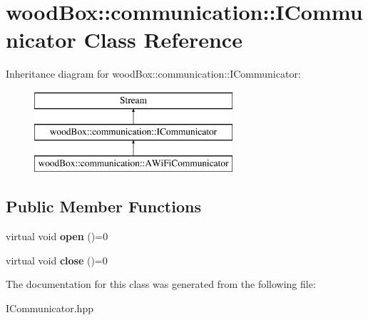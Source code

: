 \hypertarget{classwood_box_1_1communication_1_1_i_communicator}{}\section{wood\+Box\+:\+:communication\+:\+:I\+Communicator Class Reference}
\label{classwood_box_1_1communication_1_1_i_communicator}
Inheritance diagram for wood\+Box\+:\+:communication\+:\+:I\+Communicator\+:\begin{figure}[H]
\begin{center}
\leavevmode
\includegraphics[height=3.000000cm]{classwood_box_1_1communication_1_1_i_communicator}
\end{center}
\end{figure}
\subsection*{Public Member Functions}
\begin{DoxyCompactItemize}
\item 
\mbox{\label{classwood_box_1_1communication_1_1_i_communicator_abc731c594645f869db95a557e387958d}} 
virtual void {\bfseries open} ()=0
\item 
\mbox{\label{classwood_box_1_1communication_1_1_i_communicator_afca0e27bcc0c65273c7e020dc30145fb}} 
virtual void {\bfseries close} ()=0
\end{DoxyCompactItemize}


The documentation for this class was generated from the following file\+:\begin{DoxyCompactItemize}
\item 
I\+Communicator.\+hpp\end{DoxyCompactItemize}
